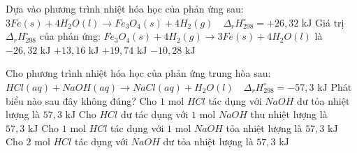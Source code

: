 \documentclass[Main.tex]{subfiles}
\begin{document}
	\begin{ex}
		 Dựa vào phương trình nhiệt hóa học của phản ứng sau:
		$3Fe(s) + 4H_2O(l) \longrightarrow Fe_3O_4(s) + 4H_2(g) \quad \Delta_r H_{298}^{\circ} = +26{,}32 \text{ kJ}$
		Giá trị $\Delta_r H_{298}^{\circ}$ của phản ứng: $Fe_3O_4(s) + 4H_2(g) \longrightarrow 3Fe(s) + 4H_2O(l)$ là
		{\True $-26{,}32 \text{ kJ}$}
		{$+13{,}16 \text{ kJ}$}
		{$+19{,}74 \text{ kJ}$}
		{$-10{,}28 \text{ kJ}$}
	\end{ex}
	\begin{ex}
		 Cho phương trình nhiệt hóa học của phản ứng trung hòa sau:
		$HCl(aq) + NaOH(aq) \longrightarrow NaCl(aq) + H_2O(l) \quad \Delta_r H_{298}^{\circ} = -57{,}3 \text{ kJ}$
		Phát biểu nào sau đây không đúng?
		\choice
		{Cho $1$ mol $HCl$ tác dụng với $NaOH$ dư tỏa nhiệt lượng là $57{,}3 \text{ kJ}$}
		{Cho $HCl$ dư tác dụng với $1$ mol $NaOH$ thu nhiệt lượng là $57{,}3 \text{ kJ}$}
		{\True Cho $1$ mol $HCl$ tác dụng với $1$ mol $NaOH$ tỏa nhiệt lượng là $57{,}3 \text{ kJ}$}
		{Cho $2$ mol $HCl$ tác dụng với $NaOH$ dư tỏa nhiệt lượng là $57{,}3 \text{ kJ}$}
	\end{ex}
	
\end{document}
